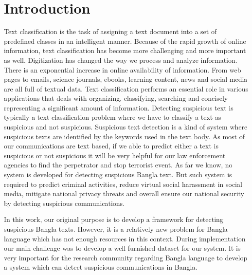 \section{\textbf{Introduction}}
Text classification is the task of assigning a text document into a set of predefined classes in an intelligent manner. Because of the rapid growth of online information, text classification has become more challenging and more important as well. Digitization has changed
the way we process and analyze information. There is an exponential increase in online availability of information. From web pages to emails, science journals, ebooks, learning content, news and social media are all full of textual data. Text classification performs an essential role in various applications that deals with organizing, classifying, searching and concisely representing a significant amount of information. Detecting suspicious text is typically a text classification problem where we have to classify a text as suspicious and not suspicious. Suspicious text detection is a kind of system where suspicious texts are identified by the keywords used in the text body. As most of our communications are text based, if we able to predict either a text is suspicious or not suspicious it will be very helpful for our law enforcement agencies to find the perpetrator and stop terrorist event. As far we know, no system is developed for detecting suspicious Bangla text. But such system is required to predict criminal activities, reduce virtual social harassment in social media, mitigate national privacy threats and overall ensure our national security by detecting suspicious communications. 

In this work, our original purpose is to develop a framework for detecting suspicious Bangla texts. However, it is a relatively new problem for Bangla language which has not enough resources in this context. During implementation our main challenge was to develop a well furnished dataset for our system. It is very important for the research community regarding Bangla language to develop a system which can detect suspicious communications in Bangla.
